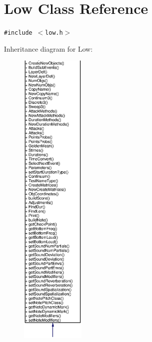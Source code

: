 \section{Low Class Reference}
\label{classLow}
{\tt \#include $<$low.h$>$}

Inheritance diagram for Low:\begin{figure}[H]
\begin{center}
\leavevmode
\includegraphics[width=88pt]{classLow__inherit__graph}
\end{center}
\end{figure}
